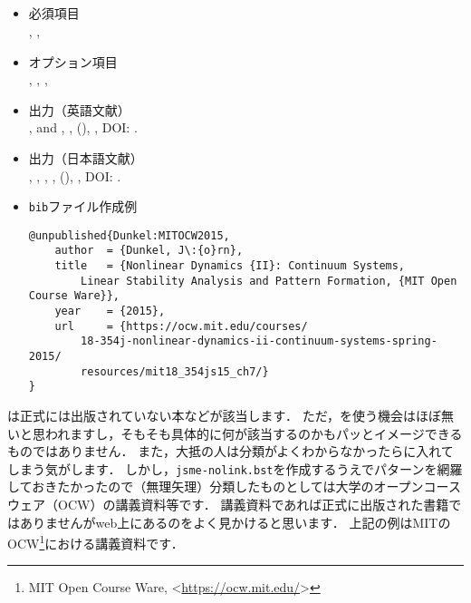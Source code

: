 \documentclass[a4paper,fleqn,uplatex,dvipdfmx]{jsarticle}
\newcommand{\jsmefile}{\texttt{jsme-nolink.bst}}
\begin{document}
\subsection{\ttunpublished}
\label{ssec:unpublished}
\begin{tcolorbox}[enhanced, title=\ttunpublished, drop fuzzy shadow]
    \begin{itemize}
        \item 必須項目 \\
        \ttauthor, \tttitle, \ttnote
        \item オプション項目 \\
        \ttmonth, \ttyear, \ttkey, \ttdoi
        \item 出力（英語文献） \\
            \colorbox[gray]{0.8}{\ttauthorf}, \colorbox[gray]{0.8}{\ttauthors} and \colorbox[gray]{0.8}{\ttauthort}, \colorbox[gray]{0.8}{\tttitle}, (\colorbox[gray]{0.8}{\ttyear}), \colorbox[gray]{0.8}{\ttnote}, DOI: \colorbox[gray]{0.8}{\ttdoi}.
        \item 出力（日本語文献） \\
            \colorbox[gray]{0.8}{\ttauthorf}, \colorbox[gray]{0.8}{\ttauthors}, \colorbox[gray]{0.8}{\ttauthort}, \colorbox[gray]{0.8}{\tttitle}, (\colorbox[gray]{0.8}{\ttyear}), \colorbox[gray]{0.8}{\ttnote}, DOI: \colorbox[gray]{0.8}{\ttdoi}.
        \item \verb|bib|ファイル作成例 \vspace{-3mm}
\begin{verbatim}
@unpublished{Dunkel:MITOCW2015,
    author  = {Dunkel, J\:{o}rn},
    title   = {Nonlinear Dynamics {II}: Continuum Systems, 
        Linear Stability Analysis and Pattern Formation, {MIT Open Course Ware}},
    year    = {2015},
    url     = {https://ocw.mit.edu/courses/
        18-354j-nonlinear-dynamics-ii-continuum-systems-spring-2015/
        resources/mit18_354js15_ch7/}
}
\end{verbatim}
    \end{itemize}
\end{tcolorbox}

\ttunpublished は正式には出版されていない本などが該当します．
ただ，\ttunpublished を使う機会はほぼ無いと思われますし，そもそも具体的に何が該当するのかもパッとイメージできるものではありません．
また，大抵の人は分類がよくわからなかったら\ttmisc に入れてしまう気がします．
しかし，\jsmefile を作成するうえでパターンを網羅しておきたかったので（無理矢理）分類したものとしては大学のオープンコースウェア（OCW）の講義資料等です．
講義資料であれば正式に出版された書籍ではありませんがweb上にあるのをよく見かけると思います．
上記の例はMITのOCW\footnote{MIT Open Course Ware, \textless\url{https://ocw.mit.edu/}\textgreater}における講義資料です．
\end{document}
